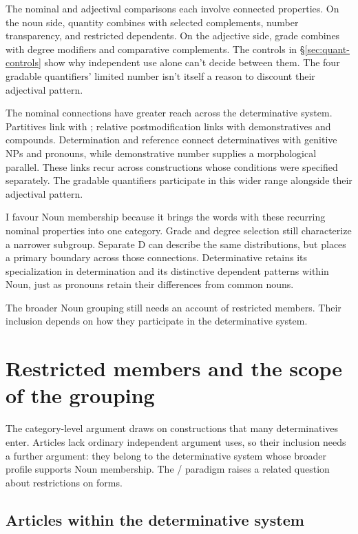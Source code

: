 \documentclass[12pt]{article}
\begin{document}
The nominal and adjectival comparisons each involve connected properties. On the noun side, quantity combines with selected complements, number transparency, and restricted dependents. On the adjective side, grade combines with degree modifiers and comparative complements. The controls in §\ref{sec:quant-controls} show why independent use alone can't decide between them. The four gradable quantifiers' limited number isn't itself a reason to discount their adjectival pattern.

The nominal connections have greater reach across the determinative system. Partitives link  with ; relative postmodification links  with demonstratives and compounds. Determination and reference connect determinatives with genitive NPs and pronouns, while demonstrative number supplies a morphological parallel. These links recur across constructions whose conditions were specified separately. The gradable quantifiers participate in this wider range alongside their adjectival pattern.

I favour Noun membership because it brings the words with these recurring nominal properties into one category. Grade and degree selection still characterize a narrower subgroup. Separate D can describe the same distributions, but places a primary boundary across those connections. Determinative retains its specialization in determination and its distinctive dependent patterns within Noun, just as pronouns retain their differences from common nouns.

The broader Noun grouping still needs an account of restricted members. Their inclusion depends on how they participate in the determinative system.

\section{Restricted members and the scope of the grouping}\label{sec:articles}

The category-level argument draws on constructions that many determinatives enter. Articles lack ordinary independent argument uses, so their inclusion needs a further argument: they belong to the determinative system whose broader profile supports Noun membership. The / paradigm raises a related question about restrictions on forms.

\subsection{Articles within the determinative system}\label{sec:article-membership}
\end{document}
